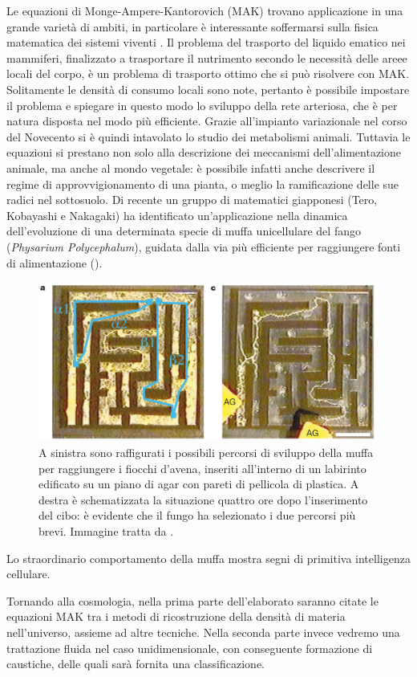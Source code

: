 Le equazioni di Monge-Ampere-Kantorovich (MAK) trovano applicazione in una grande varietà di ambiti, in particolare è interessante 
soffermarsi sulla fisica matematica dei sistemi viventi \cite{cardin}. Il problema del trasporto del liquido ematico nei mammiferi,
finalizzato a trasportare il nutrimento secondo le necessità delle areee locali del corpo, è un problema di trasporto
ottimo che si può risolvere con MAK. Solitamente le densità di consumo locali sono note, pertanto è possibile impostare
il problema e spiegare in questo modo lo sviluppo della rete arteriosa, che è per natura disposta nel modo più efficiente.
Grazie all'impianto variazionale nel corso del Novecento si è quindi intavolato lo studio dei metabolismi animali.
Tuttavia le equazioni si prestano non solo alla descrizione dei meccanismi dell'alimentazione animale, ma anche al
mondo vegetale: è possibile infatti anche descrivere il regime di approvvigionamento di una pianta, o meglio 
la ramificazione delle sue radici nel sottosuolo.
Di recente un gruppo di matematici giapponesi (Tero, Kobayashi e Nakagaki) ha identificato un'applicazione nella
dinamica dell'evoluzione di una determinata specie di muffa unicellulare del fango (\textit{Physarium Polycephalum}),
guidata dalla via più efficiente per raggiungere fonti di alimentazione (\cite{yamada}).

\begin{center}
	\begin{figure}[H]
		\centering
		\includegraphics[scale=0.3, angle=0]{yamada.png}
		\caption{A sinistra sono raffigurati i possibili percorsi di sviluppo della muffa per raggiungere i fiocchi d'avena, inseriti all'interno 
		di un labirinto edificato su un piano di agar con pareti di pellicola di plastica. A destra	è schematizzata la situazione quattro ore dopo
		l'inserimento del cibo: è evidente che il fungo ha selezionato i due percorsi più brevi. Immagine tratta da \cite{yamada}.}
		\label{fig:yamada}
	\end{figure}
\end{center}
Lo straordinario comportamento della muffa mostra segni di primitiva intelligenza cellulare.

Tornando alla cosmologia, nella prima parte dell'elaborato saranno citate le equazioni MAK tra i metodi di ricostruzione della densità di materia
nell'universo, assieme ad altre tecniche. Nella seconda parte invece vedremo una trattazione fluida nel caso unidimensionale,
con conseguente formazione di caustiche, delle quali sarà fornita una classificazione.